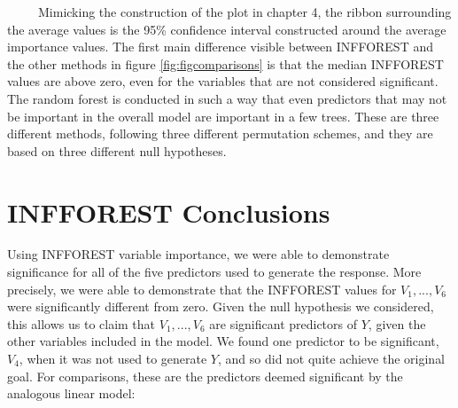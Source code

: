 \documentclass[12pt,twoside]{reedthesis}
\begin{document}
  ~~~~~Mimicking the construction of the plot in chapter 4, the ribbon
  surrounding the average values is the 95\% confidence interval
  constructed around the average importance values. The first main
  difference visible between INFFOREST and the other methods in figure
  \ref{fig:figcomparisons} is that the median INFFOREST values are above
  zero, even for the variables that are not considered significant. The
  random forest is conducted in such a way that even predictors that may
  not be important in the overall model are important in a few trees.
  These are three different methods, following three different permutation
  schemes, and they are based on three different null hypotheses.
  
  \section{INFFOREST Conclusions}\label{infforest-conclusions}
  
  Using INFFOREST variable importance, we were able to demonstrate
  significance for all of the five predictors used to generate the
  response. More precisely, we were able to demonstrate that the INFFOREST
  values for \(V_1,...,V_6\) were significantly different from zero. Given
  the null hypothesis we considered, this allows us to claim that
  \(V_1,...,V_6\) are significant predictors of \(Y\), given the other
  variables included in the model. We found one predictor to be
  significant, \(V_4\), when it was not used to generate \(Y\), and so did
  not quite achieve the original goal. For comparisons, these are the
  predictors deemed significant by the analogous linear model:
  
\end{document}
